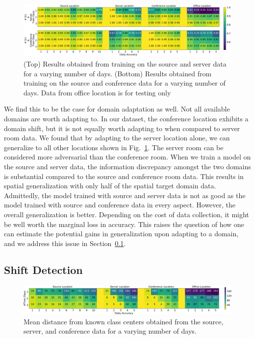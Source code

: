 \documentclass{article}
\begin{document}
\begin{figure}[ht]
\includegraphics[width=1.0\linewidth]{figures/Exp5.png} 
\caption{(Top) Results obtained from training on the source and server data for a varying number of days. (Bottom) Results obtained from training on the source and conference data for a varying number of days. Data from office location is for testing only}
\label{exp5}
\end{figure}

We find this to be the case for domain adaptation as well. Not all available domains are worth adapting to. In our dataset, the conference location exhibits a domain shift, but it is not equally worth adapting to when compared to server room data. We found that by adapting to the server location alone, we can generalize to all other locations shown in Fig.~\ref{exp5}. The server room can be considered more adversarial than the conference room. When we train a model on the source and server data, the information discrepancy amongst the two domains is substantial compared to the source and conference room data. This results in spatial generalization with only half of the spatial target domain data. Admittedly, the model trained with source and server data is not as good as the model trained with source and conference data in every aspect. However, the overall generalization is better. Depending on the cost of data collection, it might be well worth the marginal loss in accuracy. This raises the question of how one can estimate the potential gains in generalization upon adapting to a domain, and we address this issue in Section~\ref{shift}.

\subsection{Shift Detection}
\label{shift}

\begin{figure}[ht]
\includegraphics[width=1.0\linewidth]{figures/Exp4.png} 
\caption{Mean distance from known class centers obtained from the source, server, and conference data for a varying number of days.}
\label{exp4}
\end{figure}
\end{document}

